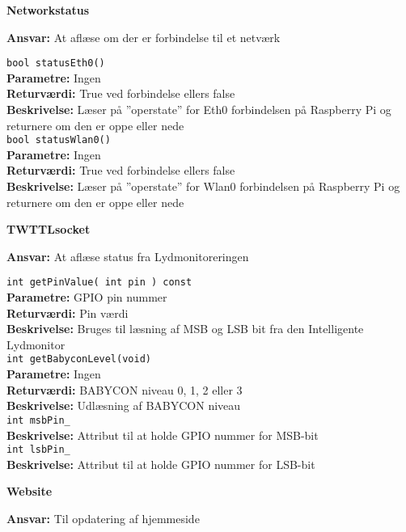 {\centering
\textbf{Networkstatus}\par
}
\textbf{Ansvar:} At aflæse om der er forbindelse til et netværk \

\verb+bool statusEth0() +\\
\textbf{Parametre:}   Ingen \\
\textbf{Returværdi:}  True ved forbindelse ellers false \\
\textbf{Beskrivelse:} Læser på ''operstate'' for Eth0 forbindelsen på Raspberry Pi og returnere om den er oppe eller nede \\

\verb+bool statusWlan0() +\\
\textbf{Parametre:}   Ingen \\
\textbf{Returværdi:}  True ved forbindelse ellers false \\
\textbf{Beskrivelse:} Læser på ''operstate'' for Wlan0 forbindelsen på Raspberry Pi og returnere om den er oppe eller nede \\

{\centering
\textbf{TWTTLsocket}\par
}
\textbf{Ansvar:} At aflæse status fra Lydmonitoreringen \

\verb+int getPinValue( int pin ) const +\\
\textbf{Parametre:}   GPIO pin nummer \\
\textbf{Returværdi:}  Pin værdi \\
\textbf{Beskrivelse:} Bruges til læsning af MSB og LSB bit fra den Intelligente Lydmonitor \\

\verb+int getBabyconLevel(void) +\\
\textbf{Parametre:}   Ingen \\
\textbf{Returværdi:}  BABYCON niveau 0, 1, 2 eller 3 \\
\textbf{Beskrivelse:} Udlæsning af BABYCON niveau \\

\verb+int msbPin_ +\\
\textbf{Beskrivelse:} Attribut til at holde GPIO nummer for MSB-bit \\

\verb+int lsbPin_ +\\
\textbf{Beskrivelse:} Attribut til at holde GPIO nummer for LSB-bit \\

{\centering
\textbf{Website}\par
}
\textbf{Ansvar:} Til opdatering af hjemmeside \